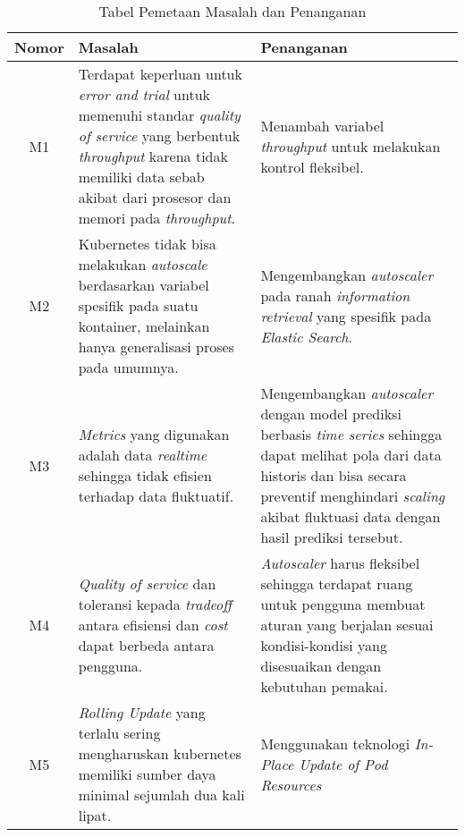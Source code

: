 \begin{table}[h]
    \caption{Tabel Pemetaan Masalah dan Penanganan}
    \vspace{0.25cm}
    \begin{center}
        \begin{tabular}{|c|p{2.5in}|p{2.5in}|}
            \rowcolor{gray!30}
            \hline
            \textbf{Nomor} & \textbf{Masalah} & \textbf{Penanganan} \tabularnewline
            \hline
            M1 & Terdapat keperluan untuk \textit{error and trial} untuk memenuhi standar \textit{quality of service} yang berbentuk \textit{throughput} karena tidak memiliki data sebab akibat dari prosesor dan memori pada \textit{throughput}. &
            Menambah variabel \textit{throughput} untuk melakukan kontrol fleksibel.
            \tabularnewline

            M2 &
            Kubernetes tidak bisa melakukan \textit{autoscale} berdasarkan variabel spesifik pada suatu kontainer, melainkan hanya generalisasi proses pada umumnya. &
            Mengembangkan \textit{autoscaler} pada ranah \textit{information retrieval} yang spesifik pada \textit{Elastic Search}. \tabularnewline

            M3 &
            \textit{Metrics} yang digunakan adalah data \textit{realtime} sehingga tidak efisien terhadap data fluktuatif. &
            Mengembangkan \textit{autoscaler} dengan model prediksi berbasis \textit{time series} sehingga dapat melihat pola dari data historis dan bisa secara preventif menghindari \textit{scaling} akibat fluktuasi data dengan hasil prediksi tersebut.\tabularnewline

            M4 & \textit{Quality of service} dan toleransi kepada \textit{tradeoff} antara efisiensi dan \textit{cost} dapat berbeda antara pengguna. &
            \textit{Autoscaler} harus fleksibel sehingga terdapat ruang untuk pengguna membuat aturan yang berjalan sesuai kondisi-kondisi yang disesuaikan dengan kebutuhan pemakai.\tabularnewline

            M5 & \textit{Rolling Update} yang terlalu sering mengharuskan kubernetes memiliki sumber daya minimal sejumlah dua kali lipat. &
            Menggunakan teknologi \textit{In-Place Update of Pod Resources} \tabularnewline
            \hline
        \end{tabular}
    \end{center}
    \label{tab:pemetaan-masalah}
\end{table}